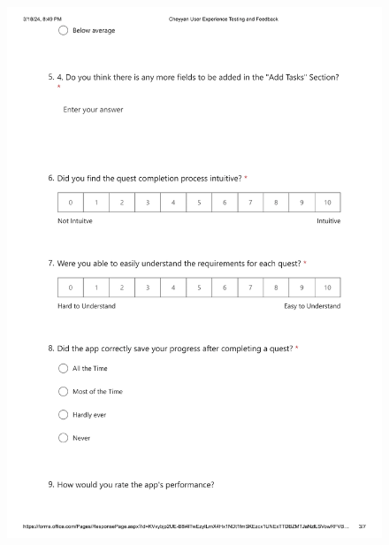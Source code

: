 \documentclass{l4proj}
\begin{document}
\begin{appendices}
\begin{figure}[h]
    \centering
    \includegraphics[height=20cm]{images/Cheyyan User Experience Testing and Feedback-3.png}
\end{figure}


\end{appendices}
\end{document}

